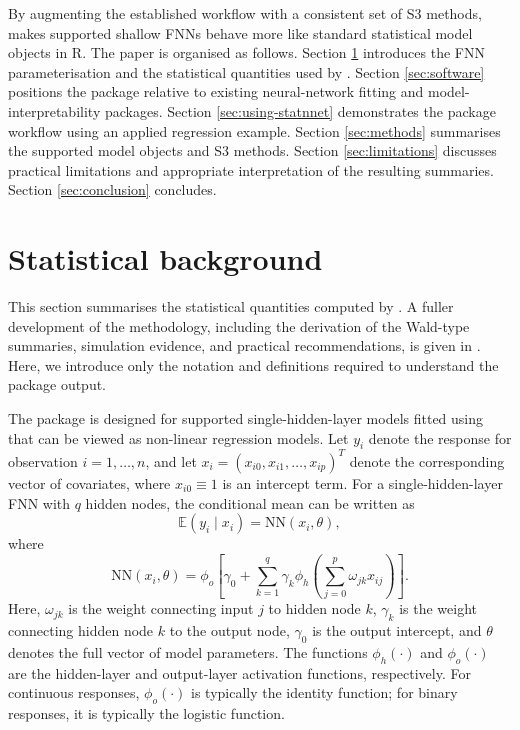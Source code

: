 By augmenting the established  workflow with a consistent set of S3 methods,  makes supported shallow FNNs behave more like standard statistical model objects in R.
The paper is organised as follows.
Section \ref{sec:fnn-background} introduces the FNN parameterisation and the statistical quantities used by .
Section \ref{sec:software} positions the package relative to existing neural-network fitting and model-interpretability packages.
Section \ref{sec:using-statnnet} demonstrates the package workflow using an applied regression example.
Section \ref{sec:methods} summarises the supported model objects and S3 methods.
Section \ref{sec:limitations} discusses practical limitations and appropriate interpretation of the resulting summaries.
Section \ref{sec:conclusion} concludes.

\section{Statistical background}\label{sec:fnn-background}

This section summarises the statistical quantities computed by .
A fuller development of the methodology, including the derivation of the Wald-type summaries, simulation evidence, and practical recommendations, is given in \citet{mcinerney2023feedforward}.
Here, we introduce only the notation and definitions required to understand the package output.

The package is designed for supported single-hidden-layer models fitted using  that can be viewed as non-linear regression models.
Let \(y_i\) denote the response for observation \(i = 1,\dots,n\), and let \(x_i = (x_{i0}, x_{i1}, \dots, x_{ip})^T\) denote the corresponding vector of covariates, where \(x_{i0} \equiv 1\) is an intercept term.
For a single-hidden-layer FNN with \(q\) hidden nodes, the conditional mean can be written as \[
    \mathbb{E}(y_i \mid x_i) = \mathrm{NN}(x_i, \theta),
\] where \[
  \mathrm{NN}(x_i, \theta) =
  \phi_o \left[
    \gamma_0 +
    \sum_{k=1}^q \gamma_k
    \phi_h \left(
      \sum_{j=0}^p \omega_{jk} x_{ij}
    \right)
  \right].
\] Here, \(\omega_{jk}\) is the weight connecting input \(j\) to hidden node \(k\), \(\gamma_k\) is the weight connecting hidden node \(k\) to the output node, \(\gamma_0\) is the output intercept, and \(\theta\) denotes the full vector of model parameters.
The functions \(\phi_h(\cdot)\) and \(\phi_o(\cdot)\) are the hidden-layer and output-layer activation functions, respectively.
For continuous responses, \(\phi_o(\cdot)\) is typically the identity function; for binary responses, it is typically the logistic function.

